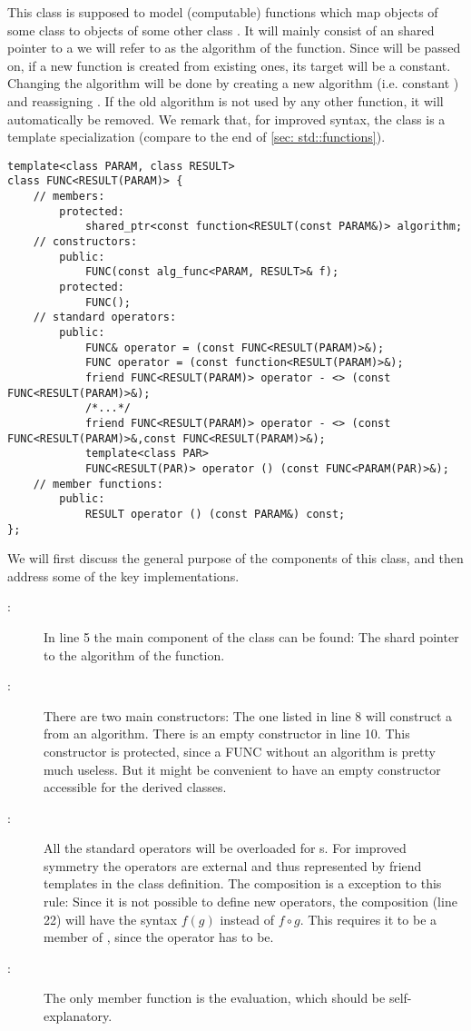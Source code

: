 This class is supposed to model (computable) functions which map objects of some class  to objects of some other class . It will mainly consist of an shared pointer  to a  we will refer to as the algorithm of the function. Since  will be passed on, if a new function is created from existing ones, its target will be a constant. Changing the algorithm will be done by creating a new algorithm (i.e. constant ) and reassigning . If the old algorithm is not used by any other function, it will automatically be removed. We remark that, for improved syntax, the class  is a template specialization (compare to the end of \cref{sec: std::functions}).
\begin{lstlisting}
template<class PARAM, class RESULT>
class FUNC<RESULT(PARAM)> {
	// members:
		protected:
			shared_ptr<const function<RESULT(const PARAM&)> algorithm;
	// constructors:
		public:
			FUNC(const alg_func<PARAM, RESULT>& f);
		protected:
			FUNC();
	// standard operators:
		public:
			FUNC& operator = (const FUNC<RESULT(PARAM)>&);
			FUNC operator = (const function<RESULT(PARAM)>&);
			friend FUNC<RESULT(PARAM)> operator - <> (const FUNC<RESULT(PARAM)>&);
			/*...*/
			friend FUNC<RESULT(PARAM)> operator - <> (const FUNC<RESULT(PARAM)>&,const FUNC<RESULT(PARAM)>&);
			template<class PAR>
			FUNC<RESULT(PAR)> operator () (const FUNC<PARAM(PAR)>&);
	// member functions:
		public:
			RESULT operator () (const PARAM&) const;
};
\end{lstlisting}
We will first discuss the general purpose of the components of this class, and then address some of the key implementations.
\begin{description}
\item[:] In line 5 the main component of the class can be found: The shard pointer to the algorithm of the function.
\item[:] There are two main constructors: The one listed in line 8 will construct a  from an algorithm. There is an empty constructor in line 10. This constructor is protected, since a FUNC without an algorithm is pretty much useless. But it might be convenient to have an empty constructor accessible for the derived classes.
\item[:] All the standard operators will be overloaded for s. For improved symmetry the operators are external and thus represented by friend templates in the class definition. The composition is a exception to this rule: Since it is not possible to define new operators, the composition (line 22) will have the syntax $f(g)$ instead of $f\circ g$. This requires it to be a member of , since the operator \code{()} has to be.
\item[:] The only member function is the evaluation, which should be self-explanatory.
\end{description}

